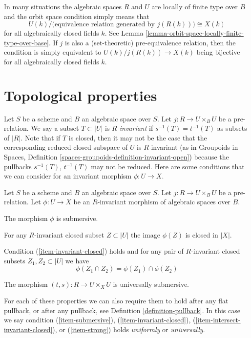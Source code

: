 \noindent
In many situations the algebraic spaces $R$ and $U$ are locally of finite type
over $B$ and the orbit space condition simply means that
$$
U(k)/\big(\text{equivalence relation generated by }j(R(k))\big)
\cong
X(k)
$$
for all algebraically closed fields $k$. See
Lemma \ref{lemma-orbit-space-locally-finite-type-over-base}.
If $j$ is also a (set-theoretic) pre-equivalence relation, then the condition
is simply equivalent to $U(k)/j(R(k)) \to X(k)$ being bijective for all
algebraically closed fields $k$.









\section{Topological properties}
\label{section-topological}

\noindent
Let $S$ be a scheme and $B$ an algebraic space over $S$.
Let $j : R \to U \times_B U$ be a pre-relation.
We say a subset $T \subset |U|$ is {\it $R$-invariant} if
$s^{-1}(T) = t^{-1}(T)$ as subsets of $|R|$.
Note that if $T$ is closed, then it may not be the case that
the corresponding reduced closed subspace of $U$ is $R$-invariant
(as in
Groupoids in Spaces, Definition
\ref{spaces-groupoids-definition-invariant-open})
because the pullbacks $s^{-1}(T)$, $t^{-1}(T)$ may not be reduced.
Here are some conditions that we can consider for an
invariant morphism $\phi : U \to X$.

\begin{definition}
\label{definition-topological}
Let $S$ be a scheme and $B$ an algebraic space over $S$.
Let $j : R \to U \times_B U$ be a pre-relation.
Let $\phi : U \to X$ be an $R$-invariant morphism of algebraic spaces over $B$.
\begin{list}{(\thesubsubsection)}%
{\setlength{}}
\item
\label{item-submersive}
The morphism $\phi$ is submersive.
\item
\label{item-invariant-closed}
For any $R$-invariant closed subset $Z \subset |U|$ the image
$\phi(Z)$ is closed in $|X|$.
\item
\label{item-intersect-invariant-closed}
Condition (\ref{item-invariant-closed}) holds and for any pair of
$R$-invariant closed subsets $Z_1, Z_2 \subset |U|$ we have
$$
\phi(Z_1 \cap Z_2) = \phi(Z_1) \cap \phi(Z_2)
$$
\item The morphism $(t, s) : R \to U \times_X U$ is universally submersive.
\label{item-strong}
\end{list}
For each of these properties we can also require them to hold after any
flat pullback, or after any pullback, see
Definition \ref{definition-pullback}. In this case we say condition
(\ref{item-submersive}),
(\ref{item-invariant-closed}),
(\ref{item-intersect-invariant-closed}), or
(\ref{item-strong}) holds {\it uniformly} or {\it universally}.
\end{definition}








